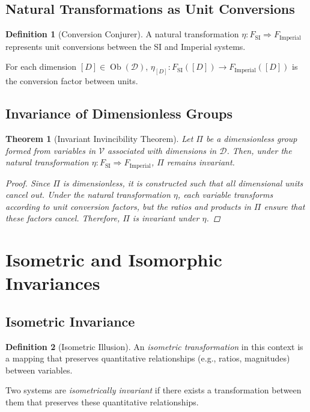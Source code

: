 \documentclass{article}
\newtheorem{theorem}{Theorem}[section]
\theoremstyle{definition}
\newtheorem{definition}{Definition}[section]
\theoremstyle{remark}
\begin{document}
	\subsection{Natural Transformations as Unit Conversions}
	
	\begin{definition}[Conversion Conjurer]
		A natural transformation $\eta: F_{\text{SI}} \Rightarrow F_{\text{Imperial}}$ represents unit conversions between the SI and Imperial systems.
		
		For each dimension $[D] \in \operatorname{Ob}(\mathcal{D})$, $\eta_{[D]}: F_{\text{SI}}([D]) \rightarrow F_{\text{Imperial}}([D])$ is the conversion factor between units.
	\end{definition}
	
	\subsection{Invariance of Dimensionless Groups}
	
	\begin{theorem}[Invariant Invincibility Theorem]
		Let $\Pi$ be a dimensionless group formed from variables in $\mathcal{V}$ associated with dimensions in $\mathcal{D}$. Then, under the natural transformation $\eta: F_{\text{SI}} \Rightarrow F_{\text{Imperial}}$, $\Pi$ remains invariant.
		
		\begin{proof}
			Since $\Pi$ is dimensionless, it is constructed such that all dimensional units cancel out. Under the natural transformation $\eta$, each variable transforms according to unit conversion factors, but the ratios and products in $\Pi$ ensure that these factors cancel. Therefore, $\Pi$ is invariant under $\eta$.
		\end{proof}
	\end{theorem}
	
	\section{Isometric and Isomorphic Invariances}
	
	\subsection{Isometric Invariance}
	
	\begin{definition}[Isometric Illusion]
		An \emph{isometric transformation} in this context is a mapping that preserves quantitative relationships (e.g., ratios, magnitudes) between variables.
		
		Two systems are \emph{isometrically invariant} if there exists a transformation between them that preserves these quantitative relationships.
	\end{definition}
	
\end{document}
